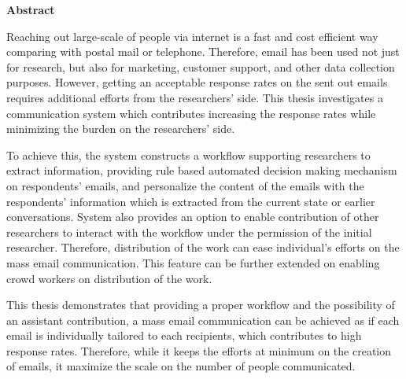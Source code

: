 
\clearemptydoublepage
{}
{}	

\vspace*{2cm}
{\Large \bf Abstract}
\vspace{1cm}

Reaching out large-scale of people via internet is a fast and cost efficient way comparing with postal mail or telephone. Therefore, email has been used not just for research, but also for marketing, customer support, and other data collection purposes. However, getting an acceptable response rates on the sent out emails requires additional efforts from the researchers' side. This thesis investigates a communication system which contributes increasing the response rates while minimizing the burden on the researchers' side. 
\vspace{1cm}

To achieve this, the system constructs a workflow supporting researchers to extract information, providing rule based automated decision making mechanism on respondents' emails, and personalize the content of the emails with the respondents' information which is extracted from the current state or earlier conversations. System also provides an option to enable contribution of other researchers to interact with the workflow under the permission of the initial researcher. Therefore, distribution of the work can ease individual's efforts on the mass email communication. This feature can be further extended on enabling crowd workers on distribution of the work.
\vspace{1cm}

This thesis demonstrates that providing a proper workflow and the possibility of an assistant contribution, a mass email communication can be achieved as if each email is individually tailored to each recipients, which contributes to high response rates. Therefore, while it keeps the efforts at minimum on the creation of emails, it maximize the scale on the number of people communicated.
